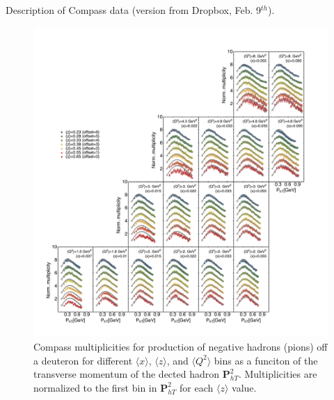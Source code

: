 \documentclass[aps,preprintnumbers,showpacs,nofootinbib,superscriptaddress,floatfix]{revtex4}
\begin{document}
Description of Compass data (version from Dropbox, Feb. 9$^{th}$).
\begin{figure}[h!]
\begin{center}
\includegraphics[width=\textwidth]{plots/COMPASS_SCIplot_flINDEP_Piminus.pdf}
\end{center}
\caption{Compass multiplicities for production of negative hadrons (pions) off a deuteron for different $\langle x \rangle$, $\langle z \rangle$, and $\langle Q^2 \rangle$ bins as a funciton of the transverse momentum of the dected hadron ${\bm P}_{hT}^ 2$. Multiplicities are normalized to the first bin in ${\bm P}_{hT}^ 2$ for each $\langle z \rangle$ value.} 
\label{f:C_pim}
\end{figure}
\end{document}
